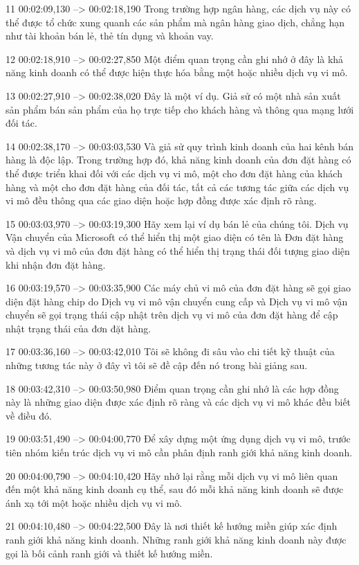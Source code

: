 11
00:02:09,130 --> 00:02:18,190
Trong trường hợp ngân hàng, các dịch vụ này có thể được tổ chức xung quanh các sản phẩm mà ngân hàng giao dịch, chẳng hạn như tài khoản bán lẻ, thẻ tín dụng và khoản vay.

12
00:02:18,910 --> 00:02:27,850
Một điểm quan trọng cần ghi nhớ ở đây là khả năng kinh doanh có thể được hiện thực hóa bằng một hoặc nhiều dịch vụ vi mô.

13
00:02:27,910 --> 00:02:38,020
Đây là một ví dụ.  Giả sử có một nhà sản xuất sản phẩm bán sản phẩm của họ trực tiếp cho khách hàng và thông qua mạng lưới đối tác.

14
00:02:38,170 --> 00:03:03,530
Và giả sử quy trình kinh doanh của hai kênh bán hàng là độc lập.  Trong trường hợp đó, khả năng kinh doanh của đơn đặt hàng có thể được triển khai đối với các dịch vụ vi mô, một cho đơn đặt hàng của khách hàng và một cho đơn đặt hàng của đối tác, tất cả các tương tác giữa các dịch vụ vi mô đều thông qua các giao diện hoặc hợp đồng được xác định rõ ràng.

15
00:03:03,970 --> 00:03:19,300
Hãy xem lại ví dụ bán lẻ của chúng tôi.  Dịch vụ Vận chuyển của Microsoft có thể hiển thị một giao diện có tên là Đơn đặt hàng và dịch vụ vi mô của đơn đặt hàng có thể hiển thị trạng thái đối tượng giao diện khi nhận đơn đặt hàng.

16
00:03:19,570 --> 00:03:35,900
Các máy chủ vi mô của đơn đặt hàng sẽ gọi giao diện đặt hàng chip do Dịch vụ vi mô vận chuyển cung cấp và Dịch vụ vi mô vận chuyển sẽ gọi trạng thái cập nhật trên dịch vụ vi mô của đơn đặt hàng để cập nhật trạng thái của đơn đặt hàng.

17
00:03:36,160 --> 00:03:42,010
Tôi sẽ không đi sâu vào chi tiết kỹ thuật của những tương tác này ở đây vì tôi sẽ đề cập đến nó trong bài giảng sau.

18
00:03:42,310 --> 00:03:50,980
Điểm quan trọng cần ghi nhớ là các hợp đồng này là những giao diện được xác định rõ ràng và các dịch vụ vi mô khác đều biết về điều đó.

19
00:03:51,490 --> 00:04:00,770
Để xây dựng một ứng dụng dịch vụ vi mô, trước tiên nhóm kiến ​​trúc dịch vụ vi mô cần phân định ranh giới khả năng kinh doanh.

20
00:04:00,790 --> 00:04:10,420
Hãy nhớ lại rằng mỗi dịch vụ vi mô liên quan đến một khả năng kinh doanh cụ thể, sau đó mỗi khả năng kinh doanh sẽ được ánh xạ tới một hoặc nhiều dịch vụ vi mô.

21
00:04:10,480 --> 00:04:22,500
Đây là nơi thiết kế hướng miền giúp xác định ranh giới khả năng kinh doanh.  Những ranh giới khả năng kinh doanh này được gọi là bối cảnh ranh giới và thiết kế hướng miền.

